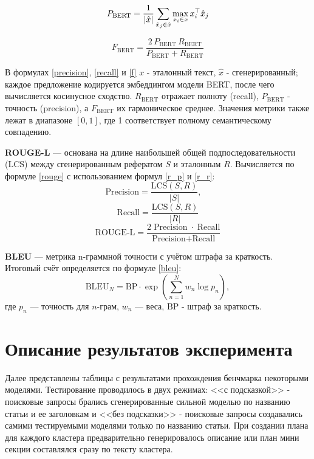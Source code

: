 \documentclass{article}
\theoremstyle{definition}
\theoremstyle{plain}
\begin{document}
\begin{equation}\label{recall}
P_{\mathrm{BERT}}= \frac{1}{|\hat{x}|}\sum_{\hat{x}_j\in\hat{x}}\max_{x_i\in x} x_i^\top \hat{x}_j\\
\end{equation}

\begin{equation}\label{f}
F_{\mathrm{BERT}}= \frac{2\,P_{\mathrm{BERT}}\,R_{\mathrm{BERT}}}{P_{\mathrm{BERT}} + R_{\mathrm{BERT}}}
\end{equation}

В формулах  \eqref{precision}, \eqref{recall} и \eqref{f} \(x\) - эталонный текст, \(\hat{x}\) - сгенерированный; каждое предложение кодируется эмбеддингом модели BERT, после чего вычисляется косинусное сходство.  
\(R_{\mathrm{BERT}}\) отражает полноту (recall), \(P_{\mathrm{BERT}}\) - точность (precision), а \(F_{\mathrm{BERT}}\) их гармоническое среднее.  
Значения метрики также лежат в диапазоне \([0,1]\), где 1 соответствует полному семантическому совпадению.

\textbf{ROUGE-L} \cite{rouge} — основана на длине наибольшей общей подпоследовательности (LCS) между сгенерированным рефератом $S$ и эталонным $R$.
Вычисляется по формуле \eqref{rouge} с использованием формул \eqref{r_p} и \eqref{r_r}:
\begin{equation}\label{r_p}
  \text{Precision} = \frac{\mathrm{LCS}(S,R)}{|S|},\quad
\end{equation}
\begin{equation}\label{r_r}
  \text{Recall} = \frac{\mathrm{LCS}(S,R)}{|R|}
\end{equation}
\begin{equation}\label{rouge}
  \text{ROUGE‑L} = \frac{2\;\text{Precision}\;\cdot\;\text{Recall}}{\text{Precision} + \text{Recall}}
\end{equation}

\textbf{BLEU} \cite{bleu} — метрика n-граммной точности с учётом штрафа за краткость. Итоговый счёт определяется по формуле \eqref{bleu}:
\begin{equation}\label{bleu}
\mathrm{BLEU}_N = \mathrm{BP}\cdot \exp\!\left(\sum_{n=1}^{N} w_n \log p_n\right),
\end{equation}
где \(p_n\) — точность для \(n\)-грам, \(w_n\) — веса, $\mathrm{BP}$ - штраф за краткость.

\section*{Описание результатов эксперимента}
Далее представлены таблицы с результатами прохождения бенчмарка некоторыми моделями. Тестирование проводилось в двух режимах: <<с подсказкой>> - поисковые запросы брались сгенерированные сильной моделью по названию статьи и ее заголовкам и 
<<без подсказки>> - поисковые запросы создавались самими тестируемыми моделями только по названию статьи.
При создании плана для каждого кластера предварительно генерировалось описание или план мини секции составлялся сразу по тексту кластера.
\end{document}
